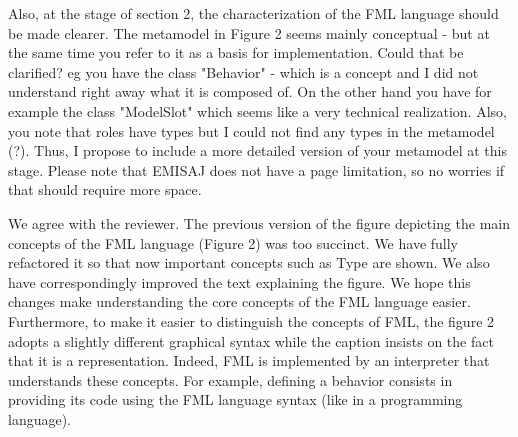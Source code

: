\documentclass[10pt]{article}
\begin{document}
\begin{response}
%
%
%
%
%
%
%
%
%

\end{response}

\begin{response}{Also, at the stage of section 2, the characterization of the FML language should be made clearer. The metamodel in Figure 2 seems mainly conceptual - but at the same time you refer to it as a basis for implementation. Could that be clarified? eg you have the class "Behavior" - which is a concept and I did not understand right away what it is composed of. On the other hand you have for example the class "ModelSlot" which seems like a very technical realization. Also, you note that roles have types but I could not find any types in the metamodel (?). Thus, I propose to include a more detailed version of your metamodel at this stage. Please note that EMISAJ does not have a page limitation, so no worries if that should require more space.}

We agree with the reviewer. The previous version of the figure depicting the main concepts of the FML language (Figure 2) was too succinct. We have fully refactored it so that now important concepts such as \textsf{Type} are shown. We also have correspondingly improved the text explaining the figure. We hope this changes make understanding the core concepts of the FML language easier.
Furthermore, to make it easier to distinguish the concepts of FML, the figure 2 adopts a slightly different graphical syntax while the caption insists on the fact that it is a representation. Indeed, FML is implemented by an interpreter that understands these concepts. For example, defining a behavior consists in providing its code using the FML language syntax (like in a programming language).

\end{response}
\end{document}
